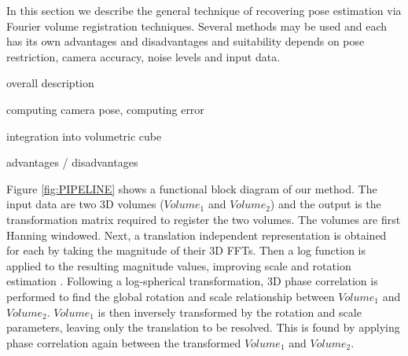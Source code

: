 
In this section we describe the general technique of recovering pose estimation via Fourier volume registration techniques. Several methods may be used and each has its own advantages and disadvantages and suitability depends on pose restriction, camera accuracy, noise levels and input data. 


overall description

computing camera pose, computing error

integration into volumetric cube

advantages / disadvantages



Figure \ref{fig:PIPELINE} shows a functional block diagram of our method. The input data are two 3D volumes ($Volume_1$ and $Volume_2$) and the output is the transformation matrix required to register the two volumes. The volumes are first Hanning windowed. Next, a translation independent representation is obtained for each by taking the magnitude of their 3D FFTs. Then a log function is applied to the resulting magnitude values, improving scale and rotation estimation \cite{Gonzalez11Improving}. Following a log-spherical transformation, 3D phase correlation is performed to find the global rotation and scale relationship between $Volume_1$ and $Volume_2$. $Volume_1$ is then inversely transformed by the rotation and scale parameters, leaving only the translation to be resolved. This is found by applying phase correlation again between the transformed $Volume_1$ and $Volume_2$. 